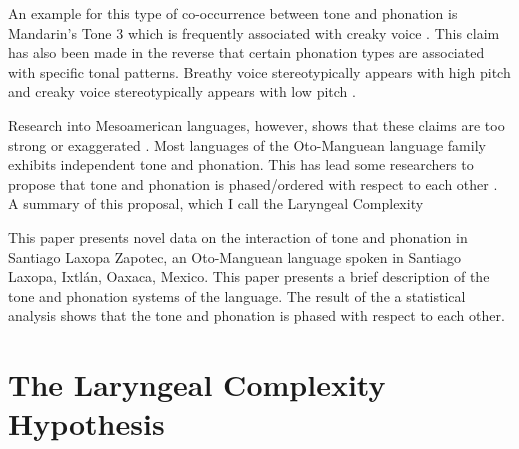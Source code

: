 \documentclass[12pt, letterpaper]{article}
\begin{document}
An example for this type of co-occurrence between tone and phonation is Mandarin's Tone 3 which is frequently associated with creaky voice \citep{hockettPeipingPhonology1947,}. This claim has also been made in the reverse that certain phonation types are associated with specific tonal patterns. Breathy voice stereotypically appears with high pitch and creaky voice stereotypically appears with low pitch \citep{eslingVoiceQualityLaryngeal2019}.

Research into Mesoamerican languages, however, shows that these claims are too strong or exaggerated \citep{suarezMesoamericanIndianLanguages1983,campbellMesoAmericaLinguisticArea1986,silvermanLaryngealComplexityOtomanguean1997,dicanioPhoneticsPhonologySan2008,espositoVariationContrastivePhonation2010, campbellOtomangueanHistoricalLinguistics2017a,campbellOtomangueanHistoricalLinguistics2017}. 
Most languages of the Oto-Manguean language family exhibits independent tone and phonation. This has lead some researchers to propose that tone and phonation is phased/ordered with respect to each other \citep{silvermanLaryngealComplexityOtomanguean1997,blankenshipTimeCourseBreathiness1997,blankenshipTimingNonmodalPhonation2002}. A summary of this proposal, which I call the Laryngeal Complexity 

This paper presents novel data on the interaction of tone and phonation in Santiago Laxopa Zapotec, an Oto-Manguean language spoken in Santiago Laxopa, Ixtlán, Oaxaca, Mexico. This paper presents a brief description of the tone and phonation systems of the language. The result of the a statistical analysis shows that the tone and phonation is phased with respect to each other. 

\section{The Laryngeal Complexity Hypothesis} \label{sec:Silverman}
\end{document}
